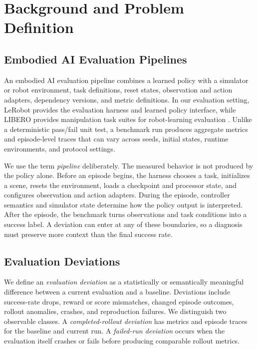 \section{Background and Problem Definition}
\label{sec:background-problem}

\subsection{Embodied AI Evaluation Pipelines}

An embodied AI evaluation pipeline combines a learned policy with a simulator or robot environment, task definitions, reset states, observation and action adapters, dependency versions, and metric definitions. In our evaluation setting, LeRobot provides the evaluation harness and learned policy interface, while LIBERO provides manipulation task suites for robot-learning evaluation \cite{liu2023libero,lerobot2026}. Unlike a deterministic pass/fail unit test, a benchmark run produces aggregate metrics and episode-level traces that can vary across seeds, initial states, runtime environments, and protocol settings.

We use the term \emph{pipeline} deliberately. The measured behavior is not produced by the policy alone. Before an episode begins, the harness chooses a task, initializes a scene, resets the environment, loads a checkpoint and processor state, and configures observation and action adapters. During the episode, controller semantics and simulator state determine how the policy output is interpreted. After the episode, the benchmark turns observations and task conditions into a success label. A deviation can enter at any of these boundaries, so a diagnosis must preserve more context than the final success rate.

\subsection{Evaluation Deviations}

We define an \emph{evaluation deviation} as a statistically or semantically meaningful difference between a current evaluation and a baseline. Deviations include success-rate drops, reward or score mismatches, changed episode outcomes, rollout anomalies, crashes, and reproduction failures. We distinguish two observable classes. A \emph{completed-rollout deviation} has metrics and episode traces for the baseline and current run. A \emph{failed-run deviation} occurs when the evaluation itself crashes or fails before producing comparable rollout metrics.

